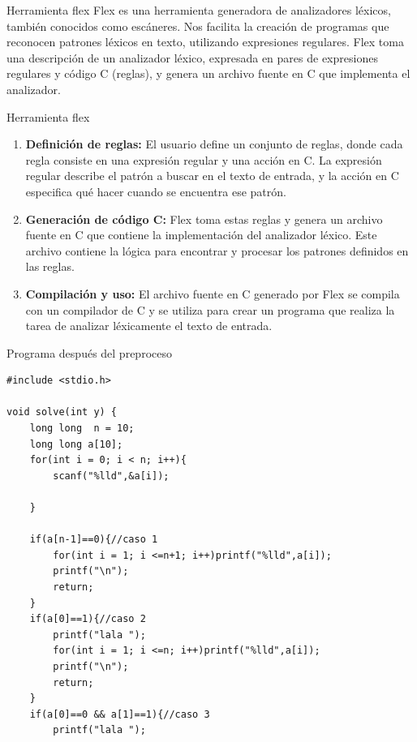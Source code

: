 \documentclass{beamer}
\begin{document}
\begin{frame}{Herramienta flex}
Flex es una herramienta generadora de analizadores léxicos, también conocidos como escáneres. Nos facilita la creación de programas que reconocen patrones léxicos en texto, utilizando expresiones regulares. Flex toma una descripción de un analizador léxico, expresada en pares de expresiones regulares y código C (reglas), y genera un archivo fuente en C que implementa el analizador.
\end{frame}

\begin{frame}{Herramienta flex}
\begin{enumerate}
 \item<1-> \textbf{Definición de reglas:} El usuario define un conjunto de reglas, donde cada regla consiste en una expresión regular y una acción en C. La expresión regular describe el patrón a buscar en el texto de entrada, y la acción en C especifica qué hacer cuando se encuentra ese patrón.
 \item<2-> \textbf{Generación de código C:} Flex toma estas reglas y genera un archivo fuente en C que contiene la implementación del analizador léxico. Este archivo contiene la lógica para encontrar y procesar los patrones definidos en las reglas.
 \item<3> \textbf{Compilación y uso:} El archivo fuente en C generado por Flex se compila con un compilador de C y se utiliza para crear un programa que realiza la tarea de analizar léxicamente el texto de entrada.
\end{enumerate}
\end{frame}

\begin{frame}[fragile]{Programa después del preproceso}{}

  \begin{lstlisting}[style=mycstyle]
#include <stdio.h>

void solve(int y) {
    long long  n = 10;
    long long a[10];
    for(int i = 0; i < n; i++){
        scanf("%lld",&a[i]);

    }

    if(a[n-1]==0){//caso 1
        for(int i = 1; i <=n+1; i++)printf("%lld",a[i]);
        printf("\n");
        return;
    }
    if(a[0]==1){//caso 2
        printf("lala ");
        for(int i = 1; i <=n; i++)printf("%lld",a[i]);
        printf("\n");
        return;
    }
    if(a[0]==0 && a[1]==1){//caso 3
        printf("lala ");
  \end{lstlisting}
\end{frame}
\end{document}
